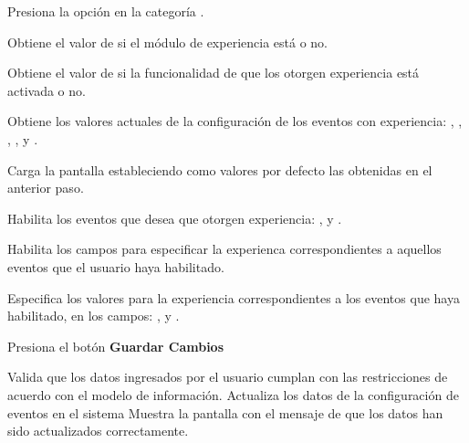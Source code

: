 \begin{UCtrayectoria}%
%
   

  \Actor Presiona la opción {\bf{}} en la categoría
         . 

  \Sistema Obtiene el valor de si el módulo de experiencia está  o no.  \label{CU-E02-3-activated}

  \Sistema Obtiene el valor de si la funcionalidad de que los  otorgen experiencia está activada o no.
            \label{CU-E02-3-events}

  \Sistema Obtiene los valores actuales de la configuración de los eventos con experiencia:
           ,
           ,
           ,
           ,
            y 
           .

  \Sistema Carga la pantalla  estableciendo como valores por defecto
           las  obtenidas en el anterior paso.

  \Actor Habilita los eventos que desea que otorgen experiencia:
           ,
            y
           .

  \Sistema Habilita los campos para especificar la experienca correspondientes a aquellos
           eventos que el usuario haya habilitado.

  \Actor Especifica los valores para la experiencia correspondientes a los eventos que haya
         habilitado, en los campos:
           ,
            y
           .

  \Actor Presiona el botón {\bf Guardar Cambios}  \label{CU-E02-3-submit}

  \Sistema Valida que los datos ingresados por el usuario cumplan con las restricciones
           de acuerdo con el modelo de información. 
  \Sistema Actualiza los datos de la configuración de eventos en el sistema
  \Sistema Muestra la pantalla  con el mensaje de que los datos han sido
           actualizados correctamente.

\end{UCtrayectoria}


